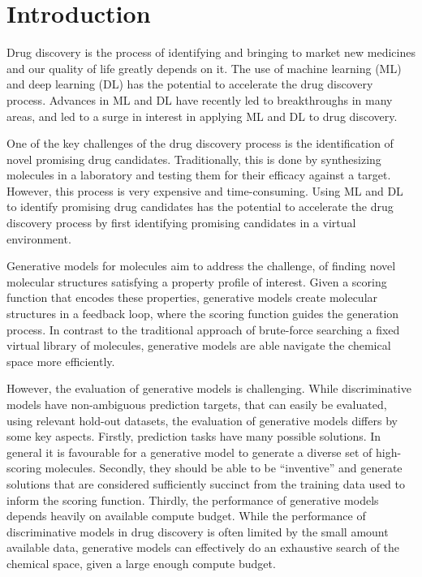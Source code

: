 \chapter{Introduction\label{chap:introduction}}
Drug discovery is the process of identifying and bringing to market new
medicines and our quality of life greatly depends on it. The use of machine
learning (ML) and deep learning (DL) has the potential to accelerate the drug
discovery process. Advances in ML and DL have recently led to breakthroughs
in many areas, and led to a surge in interest in applying ML and DL to drug
discovery.

One of the key challenges of the drug discovery process is the identification
of novel promising drug candidates. Traditionally, this is done by synthesizing
molecules in a laboratory and testing them for their efficacy against a target.
However, this process is very expensive and time-consuming. Using ML and DL
to identify promising drug candidates has the potential to accelerate the
drug discovery process by first identifying promising candidates in a virtual
environment.

Generative models for molecules aim to address the challenge, of finding novel
molecular structures satisfying a property profile of interest. Given a scoring
function that encodes these properties, generative models create molecular
structures in a feedback loop, where the scoring function guides the generation
process. In contrast to the traditional approach of brute-force searching a
fixed virtual library of molecules, generative models are able
navigate the chemical space more efficiently.

However, the evaluation of generative models is challenging. While
discriminative models have non-ambiguous prediction targets, that can easily be
evaluated, using relevant hold-out datasets, the evaluation of generative models
differs by some key aspects. Firstly, prediction tasks have many possible
solutions. In general it is favourable for a generative model to generate a
diverse set of high-scoring molecules. Secondly, they should be able to be
``inventive'' and generate solutions that are considered sufficiently succinct
from the training data used to inform the scoring function. Thirdly, the
performance of generative models depends heavily on available compute budget.
While the performance of discriminative models in drug discovery is often
limited by the small amount available data, generative models can effectively do
an exhaustive search of the chemical space, given a large enough compute budget.

